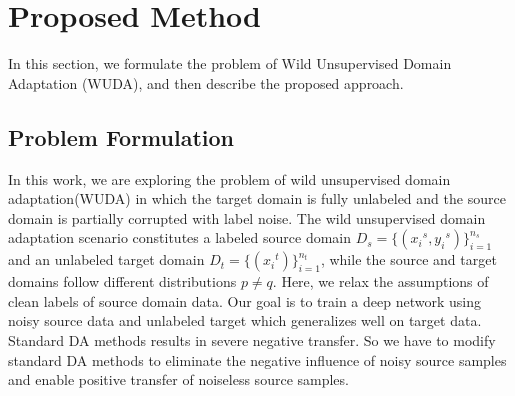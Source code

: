 \section{Proposed Method}

In this section, we formulate the problem of Wild Unsupervised Domain Adaptation (WUDA), and then describe the proposed approach.

\subsection{Problem Formulation}
In this work, we are exploring the problem of wild unsupervised domain adaptation(WUDA) in which the target domain is fully unlabeled and the source domain is partially corrupted with label noise. The wild unsupervised domain adaptation scenario constitutes a labeled source domain ${D}_s = \{({x_i}^s, {y_i}^s)\}_{i=1}^{n_s}$ and an unlabeled target domain ${D}_t = \{({x_i}^t)\}_{i=1}^{n_t}$, while the source and target domains follow different distributions $p \neq q$. Here, we relax the assumptions of clean labels of source domain data.  Our goal is to train a deep network using noisy source data and unlabeled target which generalizes well on target data. Standard DA methods results in severe negative transfer. So we have to modify standard DA methods to eliminate the negative influence of noisy source samples and enable positive transfer of noiseless source samples.

